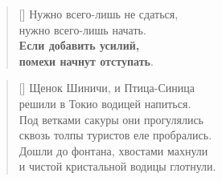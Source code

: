 \documentclass[a5paper,11pt]{memoir}
\begin{document}
\begin{verse}[\versewidth]
Нужно всего-лишь не сдаться, \\
нужно всего-лишь начать. \\
\textbf{Если добавить усилий, \\
помехи начнут отступать}.
\end{verse}

\BgThispage

\newpage

\PlainPoemTitle
{}
\settowidth{\versewidth}{ступеньки под весом скрипят и трещат ---}
\begin{verse}[\versewidth]
Щенок Шиничи, и Птица-Синица\\
решили в Токио водицей напиться.\\
Под ветками сакуры они прогулялись\\
сквозь толпы туристов еле пробрались.\\
Дошли до фонтана, хвостами махнули\\
и чистой кристальной водицы глотнули.\\
\end{verse}
\end{document}
